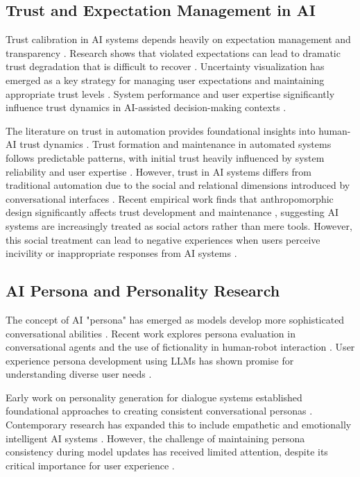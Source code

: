 \documentclass{article}
\begin{document}
\subsection{Trust and Expectation Management in AI}

Trust calibration in AI systems depends heavily on expectation management and transparency \citep{amershi2019guidelines, yin2019understanding}. Research shows that violated expectations can lead to dramatic trust degradation that is difficult to recover \citep{lai2019human, kizilcec2016much}. Uncertainty visualization has emerged as a key strategy for managing user expectations and maintaining appropriate trust levels \citep{kay2016uncertainty, reyes2025uncertainty}. System performance and user expertise significantly influence trust dynamics in AI-assisted decision-making contexts \citep{payne2024ai}.

The literature on trust in automation provides foundational insights into human-AI trust dynamics \citep{lee2004trust, hoff2015trust}. Trust formation and maintenance in automated systems follows predictable patterns, with initial trust heavily influenced by system reliability and user expertise \citep{parasuraman2000designing}. However, trust in AI systems differs from traditional automation due to the social and relational dimensions introduced by conversational interfaces \citep{muir1996trust}. Recent empirical work finds that anthropomorphic design significantly affects trust development and maintenance \citep{ta2020users, lee2020ai}, suggesting AI systems are increasingly treated as social actors rather than mere tools. However, this social treatment can lead to negative experiences when users perceive incivility or inappropriate responses from AI systems \citep{qi2025assistant}.

\subsection{AI Persona and Personality Research}

The concept of AI "persona" has emerged as models develop more sophisticated conversational abilities \citep{rashkin2018empathetic, zhong2020pec}. Recent work explores persona evaluation in conversational agents \citep{kaate2025evaluating} and the use of fictionality in human-robot interaction \citep{kaate2025fourth}. User experience persona development using LLMs has shown promise for understanding diverse user needs \citep{hur2024utilizing}.

Early work on personality generation for dialogue systems established foundational approaches to creating consistent conversational personas \citep{mairesse2007personage, walker2007generally}. Contemporary research has expanded this to include empathetic and emotionally intelligent AI systems \citep{shum2018eliza, zhou2020design}. However, the challenge of maintaining persona consistency during model updates has received limited attention, despite its critical importance for user experience \citep{wu2025memory, cheng2025mitigating}.
\end{document}
